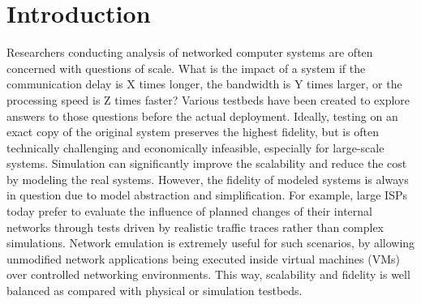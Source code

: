 \section{Introduction}
\label{VT:Sec:Intro}

Researchers conducting analysis of networked computer systems are often concerned with questions of scale.
What is the impact of a system if the communication delay is X times longer, the bandwidth is Y times larger, or the processing speed is Z times faster? 
Various testbeds have been created to explore answers to those questions before the actual deployment.
Ideally, testing on an exact copy of the original system preserves the highest fidelity,
but is often technically challenging and economically infeasible, especially for large-scale systems. 
Simulation can significantly improve the scalability and reduce the cost by modeling the real systems.
However, the fidelity of modeled systems is always in question due to model abstraction and simplification. 
For example, large ISPs today prefer to evaluate the influence of planned changes of their internal networks
through tests driven by realistic traffic traces rather than complex simulations. 
Network emulation is extremely useful for such scenarios, by allowing unmodified network
applications being executed inside virtual machines (VMs) over controlled networking environments.
This way, scalability and fidelity is well balanced as compared with physical or simulation testbeds.

